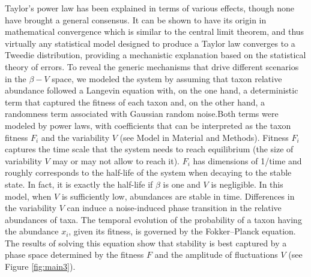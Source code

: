 Taylor's power law has been explained in terms of various effects, though none have brought a general consensus. It can be shown to have its origin in mathematical convergence which is similar to the central limit theorem, and thus virtually any statistical model designed to produce a Taylor law converges to a Tweedie distribution\cite{stat}, providing a mechanistic explanation based on the statistical theory of errors\cite{convergence1,convergence2,convergence3}. To reveal the generic mechanisms that drive different scenarios in the $\beta-V$ space, we modeled the system by assuming that taxon relative abundance followed a Langevin equation with, on the one hand, a deterministic term that captured the fitness of each taxon and, on the other hand, a randomness term associated with Gaussian random noise\cite{ranking}.Both terms were modeled by power laws, with coefficients that can be interpreted as the taxon fitness $F_i$ and the variability $V$ (see Model in Material and Methods). Fitness $F_i$ captures the time scale that the system needs to reach equilibrium (the size of variability $V$ may or may not allow to reach it). $F_i$ has dimensions of 1/time and roughly corresponds to the half-life of the system when decaying to the stable state. In fact, it is exactly the half-life if $\beta$ is one and $V$ is negligible. In this model, when $V$ is sufficiently low, abundances are stable in time. Differences in the variability $V$ can induce a noise-induced phase transition in the relative abundances of taxa. The temporal evolution of the probability of a taxon having the abundance $x_i$, given its fitness, is governed by the Fokker--Planck equation. The results of solving this equation show that stability is best captured by a phase space determined by the fitness $F$ and the amplitude of fluctuations $V$ (see Figure \ref{fig:main3}).

